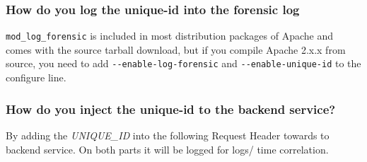 \subsubsection{How do you log the unique-id into the forensic log}
\lstinline|mod_log_forensic| is included in most distribution packages of Apache and comes with the source tarball download, but if you compile Apache 2.x.x from source, you need to add \lstinline|--enable-log-forensic| and \lstinline|--enable-unique-id| to the configure line.

\subsubsection{How do you inject the unique-id to the backend service?}
By adding the \textit{UNIQUE\_ID} into the following Request Header towards to backend service. On both parts it will be logged for logs/ time correlation.

